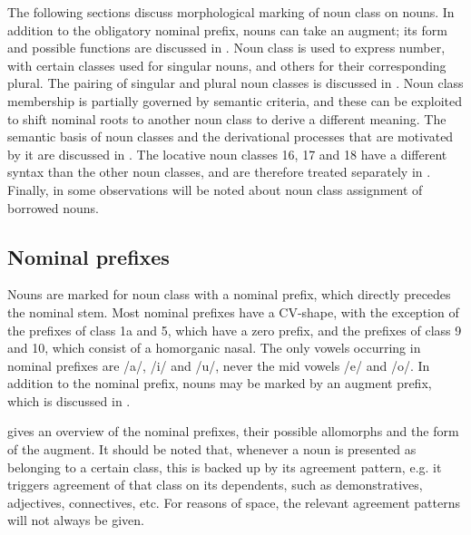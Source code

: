 The following sections discuss morphological marking of noun class on nouns. In addition to the obligatory nominal prefix, nouns can take an augment; its form and possible functions are discussed in . Noun class is used to express number, with certain classes used for singular nouns, and others for their corresponding plural. The pairing of singular and plural noun classes is discussed in . Noun class membership is partially governed by semantic criteria, and these can be exploited to shift nominal roots to another noun class to derive a different meaning. The semantic basis of noun classes and the derivational processes that are motivated by it are discussed in . The locative noun classes 16, 17 and 18 have a different syntax than the other noun classes, and are therefore treated separately in . Finally, in  some observations will be noted about noun class assignment of borrowed nouns.

\subsection{Nominal prefixes}
\label{bkm:Ref489005545}\hypertarget{Toc75352636}{}\label{bkm:Ref489364754}
Nouns are marked for noun class with a nominal prefix, which directly precedes the nominal stem. Most nominal prefixes have a CV-shape, with the exception of the prefixes of class 1a and 5, which have a zero prefix, and the prefixes of class 9 and 10, which consist of a homorganic nasal. The only vowels occurring in nominal prefixes are /a/, /i/ and /u/, never the mid vowels /e/ and /o/. In addition to the nominal prefix, nouns may be marked by an augment prefix, which is discussed in .

 gives an overview of the nominal prefixes, their possible allomorphs and the form of the augment. It should be noted that, whenever a noun is presented as belonging to a certain class, this is backed up by its agreement pattern, e.g. it triggers agreement of that class on its dependents, such as demonstratives, adjectives, connectives, etc. For reasons of space, the relevant agreement patterns will not always be given.

